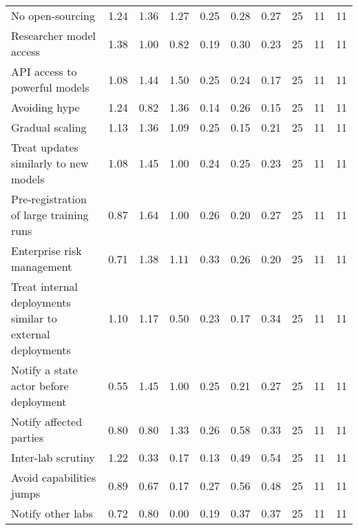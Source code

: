 \documentclass{article}
\begin{document}
\begin{sidewaystable}
\begin{tabular}{l*{9}{r}}
No open-sourcing & 1.24 & 1.36 & 1.27 & 0.25 & 0.28 & 0.27 & 25 & 11 & 11 \\
Researcher model access & 1.38 & 1.00 & 0.82 & 0.19 & 0.30 & 0.23 & 25 & 11 & 11 \\
API access to powerful models & 1.08 & 1.44 & 1.50 & 0.25 & 0.24 & 0.17 & 25 & 11 & 11 \\
Avoiding hype & 1.24 & 0.82 & 1.36 & 0.14 & 0.26 & 0.15 & 25 & 11 & 11 \\
Gradual scaling & 1.13 & 1.36 & 1.09 & 0.25 & 0.15 & 0.21 & 25 & 11 & 11 \\
Treat updates similarly to new models & 1.08 & 1.45 & 1.00 & 0.24 & 0.25 & 0.23 & 25 & 11 & 11 \\
Pre-registration of large training runs & 0.87 & 1.64 & 1.00 & 0.26 & 0.20 & 0.27 & 25 & 11 & 11 \\
Enterprise risk management & 0.71 & 1.38 & 1.11 & 0.33 & 0.26 & 0.20 & 25 & 11 & 11 \\
Treat internal deployments similar to external deployments & 1.10 & 1.17 & 0.50 & 0.23 & 0.17 & 0.34 & 25 & 11 & 11 \\
Notify a state actor before deployment & 0.55 & 1.45 & 1.00 & 0.25 & 0.21 & 0.27 & 25 & 11 & 11 \\
Notify affected parties & 0.80 & 0.80 & 1.33 & 0.26 & 0.58 & 0.33 & 25 & 11 & 11 \\
Inter-lab scrutiny & 1.22 & 0.33 & 0.17 & 0.13 & 0.49 & 0.54 & 25 & 11 & 11 \\
Avoid capabilities jumps & 0.89 & 0.67 & 0.17 & 0.27 & 0.56 & 0.48 & 25 & 11 & 11 \\
Notify other labs & 0.72 & 0.80 & 0.00 & 0.19 & 0.37 & 0.37 & 25 & 11 & 11 \\
        \bottomrule
    \end{tabular}
\end{sidewaystable}
\end{document}
